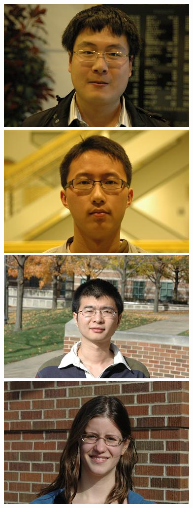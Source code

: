 \documentclass[10pt,journal,letterpaper,compsoc]{IEEEtran} %
\begin{document}
\begin{figure}
\vspace{2mm}
\centering
\includegraphics[scale=0.75,clip=true]{figures_pami/uiuc_example/glasses/DSC_1397.JPG}
\includegraphics[scale=0.75,clip=true]{figures_pami/uiuc_example/glasses/DSC_1532.JPG}
\includegraphics[scale=0.75,clip=true]{figures_pami/uiuc_example/glasses/DSC_1556.JPG}
\includegraphics[scale=0.75,clip=true]{figures_pami/uiuc_example/glasses/DSC_1585.JPG}

\end{figure}
\end{document}
